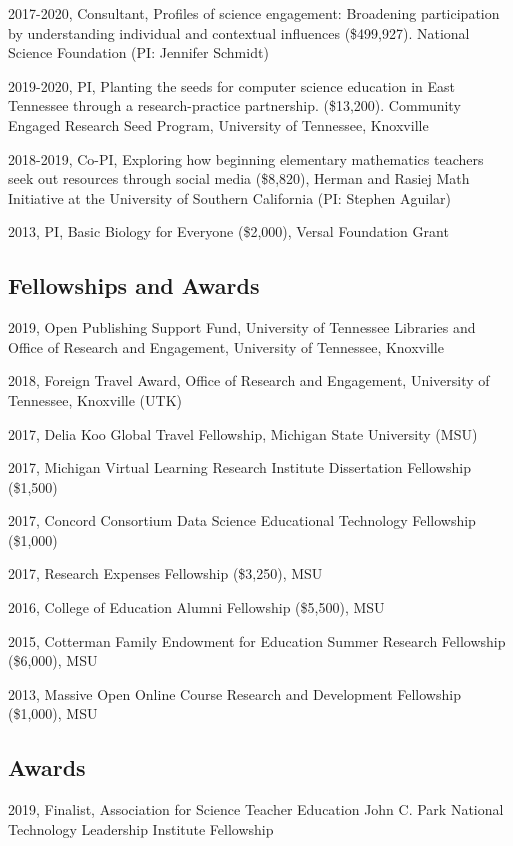 \documentclass[14,]{article}
\begin{document}
2017-2020, Consultant, Profiles of science engagement: Broadening
participation by understanding individual and contextual influences
(\$499,927). National Science Foundation (PI: Jennifer Schmidt)

2019-2020, PI, Planting the seeds for computer science education in East
Tennessee through a research-practice partnership. (\$13,200). Community
Engaged Research Seed Program, University of Tennessee, Knoxville

2018-2019, Co-PI, Exploring how beginning elementary mathematics
teachers seek out resources through social media (\$8,820), Herman and
Rasiej Math Initiative at the University of Southern California (PI:
Stephen Aguilar)

2013, PI, Basic Biology for Everyone (\$2,000), Versal Foundation Grant

\subsection{Fellowships and Awards}\label{fellowships-and-awards}

2019, Open Publishing Support Fund, University of Tennessee Libraries
and Office of Research and Engagement, University of Tennessee,
Knoxville

2018, Foreign Travel Award, Office of Research and Engagement,
University of Tennessee, Knoxville (UTK)

2017, Delia Koo Global Travel Fellowship, Michigan State University
(MSU)

2017, Michigan Virtual Learning Research Institute Dissertation
Fellowship (\$1,500)

2017, Concord Consortium Data Science Educational Technology Fellowship
(\$1,000)

2017, Research Expenses Fellowship (\$3,250), MSU

2016, College of Education Alumni Fellowship (\$5,500), MSU

2015, Cotterman Family Endowment for Education Summer Research
Fellowship (\$6,000), MSU

2013, Massive Open Online Course Research and Development Fellowship
(\$1,000), MSU

\subsection{Awards}\label{awards}

2019, Finalist, Association for Science Teacher Education John C. Park
National Technology Leadership Institute Fellowship
\end{document}
